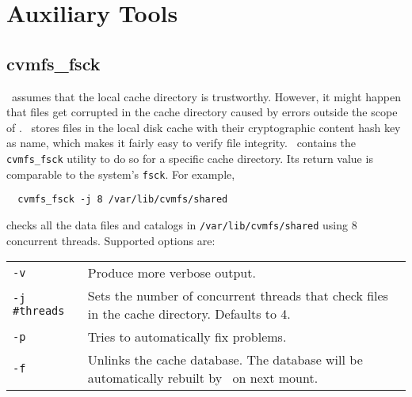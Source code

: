 \section{Auxiliary Tools}
\label{sct:tools}

\subsection{cvmfs\_fsck}
\cvmfs\ assumes that the local cache directory is trustworthy.
However, it might happen that files get corrupted in the cache directory caused by errors outside the scope of \cvmfs.
\cvmfs\ stores files in the local disk cache with their cryptographic content hash key as name, which makes it fairly easy to verify file integrity.
\cvmfs\ contains the \texttt{cvmfs\_fsck} utility to do so for a specific cache directory. 
Its return value is comparable to the system's \texttt{fsck}.
For example,
\begin{verbatim}
  cvmfs_fsck -j 8 /var/lib/cvmfs/shared
\end{verbatim}
checks all the data files and catalogs in \texttt{/var/lib/cvmfs/shared} using 8 concurrent threads.  
Supported options are:

\begin{tabularx}{\linewidth}{lX}
	\texttt{-v}				& Produce more verbose output.\\
	\texttt{-j \#threads}	& Sets the number of concurrent threads that check files in the cache directory. Defaults to 4. \\
	\texttt{-p} 			& Tries to automatically fix problems. \\
	\texttt{-f} 			& Unlinks the cache database.  The database will be automatically rebuilt by \cvmfs\ on next mount.\\
\end{tabularx}

